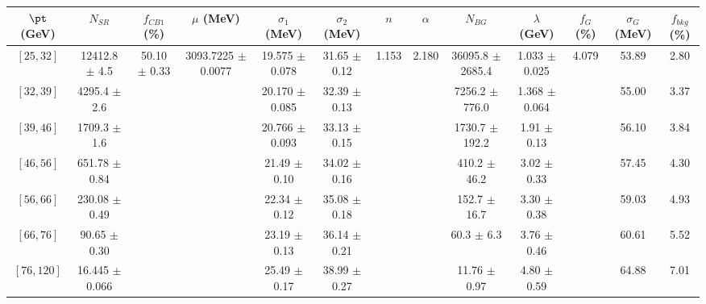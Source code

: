 \begin{tabular}{c||c|c|c|c|c|c|c|c|c|c|c||c}
$\pt$ (GeV) & $N_{SR}$ & $f_{CB1}$ (\%) & $\mu$ (MeV) & $\sigma_1$ (MeV) & $\sigma_2$ (MeV) & $n$ & $\alpha$ & $N_{BG}$ & $\lambda$ (GeV) & $f_G$ (\%) & $\sigma_G$ (MeV) & $f_{bkg}$ (\%) \\
\hline
$[25, 32]$ & 12412.8 $\pm$ 4.5 & \multirow{7}{*}{50.10 $\pm$ 0.33} & \multirow{7}{*}{3093.7225 $\pm$ 0.0077} & 19.575 $\pm$ 0.078 & 31.65 $\pm$ 0.12 & \multirow{7}{*}{1.153} & \multirow{7}{*}{2.180} & 36095.8 $\pm$ 2685.4 & 1.033 $\pm$ 0.025 & \multirow{7}{*}{4.079} & 53.89 & 2.80\\
$[32, 39]$ & 4295.4 $\pm$ 2.6 &  &  & 20.170 $\pm$ 0.085 & 32.39 $\pm$ 0.13 &  &  & 7256.2 $\pm$ 776.0 & 1.368 $\pm$ 0.064 &  & 55.00 & 3.37\\
$[39, 46]$ & 1709.3 $\pm$ 1.6 &  &  & 20.766 $\pm$ 0.093 & 33.13 $\pm$ 0.15 &  &  & 1730.7 $\pm$ 192.2 & 1.91 $\pm$ 0.13 &  & 56.10 & 3.84\\
$[46, 56]$ & 651.78 $\pm$ 0.84 &  &  & 21.49 $\pm$ 0.10 & 34.02 $\pm$ 0.16 &  &  & 410.2 $\pm$ 46.2 & 3.02 $\pm$ 0.33 &  & 57.45 & 4.30\\
$[56, 66]$ & 230.08 $\pm$ 0.49 &  &  & 22.34 $\pm$ 0.12 & 35.08 $\pm$ 0.18 &  &  & 152.7 $\pm$ 16.7 & 3.30 $\pm$ 0.38 &  & 59.03 & 4.93\\
$[66, 76]$ & 90.65 $\pm$ 0.30 &  &  & 23.19 $\pm$ 0.13 & 36.14 $\pm$ 0.21 &  &  & 60.3 $\pm$ 6.3 & 3.76 $\pm$ 0.46 &  & 60.61 & 5.52\\
$[76, 120]$ & 16.445 $\pm$ 0.066 &  &  & 25.49 $\pm$ 0.17 & 38.99 $\pm$ 0.27 &  &  & 11.76 $\pm$ 0.97 & 4.80 $\pm$ 0.59 &  & 64.88 & 7.01\\
\end{tabular}
